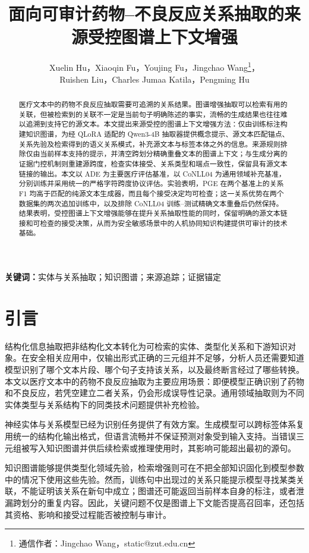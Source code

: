 \documentclass[UTF8,a4paper,twocolumn,10pt]{ctexart}
\title{面向可审计药物--不良反应关系抽取的来源受控图谱上下文增强}
\author{Xuelin Hu，Xiaoqin Fu，Youjing Fu，Jingchao Wang\thanks{通信作者：Jingchao Wang，static@zut.edu.cn}，\\
Ruishen Liu，Charles Jumaa Katila，Pengming Hu}
\date{}
\begin{document}
\maketitle

\begin{abstract}
医疗文本中的药物不良反应抽取需要可追溯的关系结果。图谱增强抽取可以检索有用的关联，但被检索到的关联不一定是当前句子明确陈述的事实，流畅的生成结果也往往难以追溯到支持它的源文本。本文提出来源受控的图谱上下文增强方法：仅由训练标注构建知识图谱，为经 QLoRA 适配的 Qwen3-4B 抽取器提供概念提示、源文本匹配锚点、关系先验及检索得到的语义关系模式，补充源文本与标签本体之外的信息。来源规则排除仅由当前样本支持的提示，并清空跨划分精确重叠文本的图谱上下文；与生成分离的证据门控机制则重建源跨度，检查实体接受、关系类型和端点一致性，保留具有源文本链接的输出。本文以 ADE 为主要医疗评估基准，以 CoNLL04 为通用领域补充基准，分别训练并采用统一的严格字符跨度协议评估。实验表明，PGE 在两个基准上的关系 F1 均高于匹配的纯源文本生成器，而且每个接受决定均可检查；这一关系优势在两个数据集的两次追加训练中，以及排除 CoNLL04 训练--测试精确文本重叠后仍然保持。结果表明，受控图谱上下文增强能够在提升关系抽取性能的同时，保留明确的源文本链接和可检查的接受决策，从而为安全敏感场景中的人机协同知识构建提供可审计的技术基础。
\end{abstract}

\noindent\textbf{关键词：}实体与关系抽取；知识图谱；来源追踪；证据锚定

\section{引言}
结构化信息抽取把非结构化文本转化为可检索的实体、类型化关系和下游知识对象。在安全相关应用中，仅输出形式正确的三元组并不足够，分析人员还需要知道模型识别了哪个文本片段、哪个句子支持该关系，以及最终断言经过了哪些转换。本文以医疗文本中的药物不良反应抽取为主要应用场景：即便模型正确识别了药物和不良反应，若凭空建立二者关系，仍会形成误导性记录。通用领域抽取则为不同实体类型与关系结构下的同类技术问题提供补充检验。

神经实体与关系模型已经为识别任务提供了有效方案\cite{li2022ner}。生成模型可以跨标签体系复用统一的结构化输出格式，但语言流畅并不保证预测对象受到输入支持\cite{ji2023hallucination}。当错误三元组被写入知识图谱并供后续检索或推理使用时，其影响可能超出最初的源句。

知识图谱能够提供类型化领域先验\cite{hogan2021kg}，检索增强则可在不把全部知识固化到模型参数中的情况下使用这些先验\cite{lewis2020rag}。然而，训练句中出现过的关系只能提示模型寻找某类关联，不能证明该关系在新句中成立；图谱还可能返回当前样本自身的标注，或者泄漏跨划分的重复内容。因此，关键问题不仅是图谱上下文能否提高召回率，还包括其资格、影响和接受过程能否被控制与审计。
\end{document}
